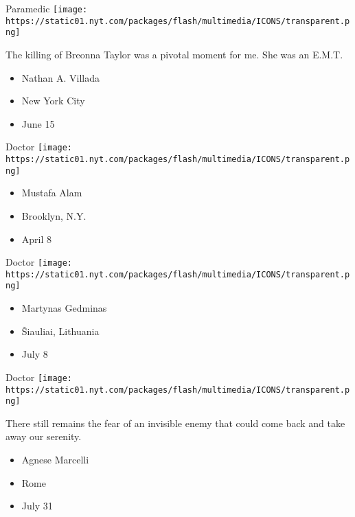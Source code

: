 \protect\hyperlink{item-nathan-a-villada}{}

Paramedic
\texttt{[image: https://static01.nyt.com/packages/flash/multimedia/ICONS/transparent.png]}

The killing of Breonna Taylor was a pivotal moment for me. She was an
E.M.T.

\begin{itemize}
\tightlist
\item
  Nathan A. Villada
\item
  New York City
\item
  June 15
\end{itemize}

\protect\hyperlink{item-mustafa-alam}{}

Doctor
\texttt{[image: https://static01.nyt.com/packages/flash/multimedia/ICONS/transparent.png]}

\begin{itemize}
\tightlist
\item
  Mustafa Alam
\item
  Brooklyn, N.Y.
\item
  April 8
\end{itemize}

\protect\hyperlink{item-martynas-gedminas}{}

Doctor
\texttt{[image: https://static01.nyt.com/packages/flash/multimedia/ICONS/transparent.png]}

\begin{itemize}
\tightlist
\item
  Martynas Gedminas
\item
  Šiauliai, Lithuania
\item
  July 8
\end{itemize}

\protect\hyperlink{item-agnese-marcelli}{}

Doctor
\texttt{[image: https://static01.nyt.com/packages/flash/multimedia/ICONS/transparent.png]}

There still remains the fear of an invisible enemy that could come back
and take away our serenity.

\begin{itemize}
\tightlist
\item
  Agnese Marcelli
\item
  Rome
\item
  July 31
\end{itemize}

\protect\hyperlink{item-whitney-douglass}{}

